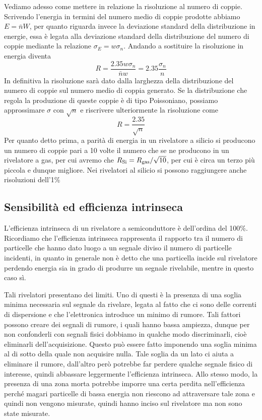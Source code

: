 Vediamo adesso come mettere in relazione la risoluzione al numero di coppie. Scrivendo l'energia in termini del numero medio di coppie prodotte abbiamo $E=\bar{n}W$, per quanto riguarda invece la deviazione standard della distribuzione in energie, essa è legata alla deviazione standard della distribuzione del numero di coppie mediante la relazione $\sigma_E=w \sigma_n$. Andando a sostituire la risoluzione in energia diventa
\begin{equation*}
   R
   =\frac{2.35w \sigma_n}{\bar{n} w}
   =2.35\frac{\sigma_n}{n}
\end{equation*}
In definitiva la risoluzione sarà dato dalla larghezza della distribuzione del numero di coppie sul numero medio di coppia generato. Se la distribuzione che regola la produzione di queste coppie è di tipo Poissoniano, possiamo approssimare $\sigma$ con $\sqrt{n}$ e riscrivere ulteriormente la risoluzione come
\begin{equation*}
   R=\frac{2.35}{\sqrt{n}}
\end{equation*}
Per quanto detto prima, a parità di energia in un rivelatore a silicio si producono un numero di coppie pari a 10 volte il numero che se ne producono in un rivelatore a gas, per cui avremo che $R_{\rm Si}=R_{\rm gas}/\sqrt{10}$, per cui è circa un terzo più piccola e dunque migliore.
Nei rivelatori al silicio si possono raggiungere anche risoluzioni dell'1\%

\subsection{Sensibilità ed efficienza intrinseca}

L'efficienza intrinseca di un rivelatore a semiconduttore è dell'ordina del 100\%. Ricordiamo che l'efficienza intrinseca rappresenta il rapporto tra il numero di particelle che hanno dato luogo a un segnale diviso il numero di particelle incidenti, in quanto in generale non è detto che una particella incide sul rivelatore perdendo energia sia in grado di produrre un segnale rivelabile, mentre in questo caso sì.

Tali rivelatori presentano dei limiti. Uno di questi è la presenza di una soglia minima necessaria sul segnale da rivelare, legata al fatto che ci sono delle correnti di dispersione e che l'elettronica introduce un minimo di rumore. Tali fattori possono creare dei segnali di rumore, i quali hanno bassa ampiezza, dunque per non confonderli con segnali fisici dobbiamo in qualche modo discriminarli, cioè eliminarli dell'acquisizione. Questo può essere fatto imponendo una soglia minima al di sotto della quale non acquisire nulla. Tale soglia da un lato ci aiuta a eliminare il rumore, dall'altro però potrebbe far perdere qualche segnale fisico di interesse, quindi abbassare leggermente l'efficienza intrinseca. Allo stesso modo, la presenza di una zona morta potrebbe imporre una certa perdita nell'efficienza perché magari particelle di bassa energia non riescono ad attraversare tale zona e quindi non vengono misurate, quindi hanno inciso sul rivelatore ma non sono state misurate.

